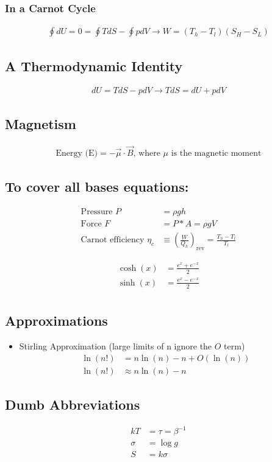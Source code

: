 \subsubsection*{In a Carnot Cycle}
\begin{align}
	\oint dU = 0 = \oint TdS - \oint pdV \rightarrow W = (T_h - T_l) (S_H - S_L)
\end{align}

\subsection*{A Thermodynamic Identity}
\begin{align}
	dU = TdS -pdV \rightarrow	TdS = dU + p dV
\end{align}

\subsection*{Magnetism}
\begin{align}
	\text{Energy (E)} = -\vec{\mu} \cdot \vec{B} \text{, where $\mu$ is the magnetic moment}
\end{align}

\subsection*{To cover all bases equations:}
\begin{align}
	\text{Pressure } P               & = \rho g h                                                \\
	\text{Force } F                  & = P * A = \rho g V                                        \\
	\text{Carnot efficiency } \eta_c & \equiv (\frac{W}{Q_h})_\text{rev} = \frac{T_h - T_l}{T_l}
\end{align}

\begin{align}
	\cosh(x) & = \frac{e^x + e^{-x}}{2} \\
	\sinh(x) & = \frac{e^x - e^{-x}}{2} \\
\end{align}
\subsection*{Approximations}

\begin{itemize}
	\item Stirling Approximation (large limits of n ignore the $O$ term)
	      \begin{align*}
		      \ln(n!) & = n \ln(n) - n + O(\ln(n)) \\
		      \ln(n!) & \approx n \ln(n) - n
	      \end{align*}
\end{itemize}


\subsection*{Dumb Abbreviations}
\begin{align*}
	k T    & = \tau  = \beta^{-1} \\
	\sigma & = \log g             \\
	S      & = k \sigma
\end{align*}
